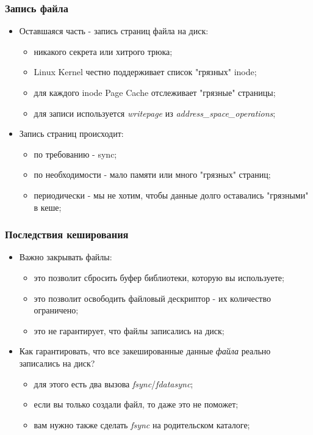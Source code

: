 \begin{frame}
\frametitle{Запись файла}
\begin{itemize}
  \item<1-> Оставшаяся часть - запись страниц файла на диск:
    \begin{itemize}
      \item никакого секрета или хитрого трюка;
      \item Linux Kernel честно поддерживает список "грязных" inode;
      \item для каждого inode Page Cache отслеживает "грязные"
            страницы;
      \item для записи используется \emph{writepage} из
            \emph{address\_space\_operations};
    \end{itemize}
  \item<2-> Запись страниц происходит:
    \begin{itemize}
      \item по требованию - sync;
      \item по необходимости - мало памяти или много "грязных" страниц;
      \item периодически - мы не хотим, чтобы данные долго оставались
            "грязными" в кеше;
    \end{itemize}
\end{itemize}
\end{frame}

\begin{frame}
\frametitle{Последствия кеширования}
\begin{itemize}
  \item<1-> Важно закрывать файлы:
    \begin{itemize}
      \item это позволит сбросить буфер библиотеки, которую вы
            используете;
      \item это позволит освободить файловый дескриптор - их количество
            ограничено;
      \item это не гарантирует, что файлы записались на диск;
    \end{itemize}
  \item<2-> Как гарантировать, что все закешированные данные \emph{файла}
            реально записались на диск?
    \begin{itemize}
      \item для этого есть два вызова \emph{fsync}/\emph{fdatasync};
      \item если вы только создали файл, то даже это не поможет;
      \item вам нужно также сделать \emph{fsync} на родительском каталоге;
    \end{itemize}
\end{itemize}
\end{frame}
